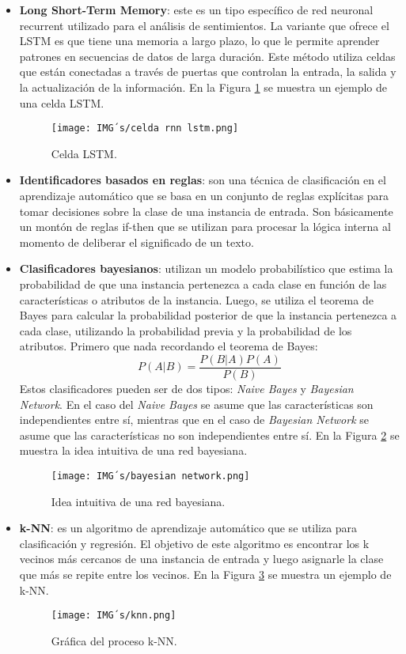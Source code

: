 \documentclass[12pt, conference]{IEEEtran}
\begin{document}
\begin{itemize}
  \item \textbf{Long Short-Term Memory}: este es un tipo específico de red neuronal recurrent utilizado para el análisis de sentimientos. La variante que ofrece el LSTM es que tiene una memoria a largo plazo, lo que le permite aprender patrones en secuencias de datos de larga duración. Este método utiliza celdas que están conectadas a través de puertas que controlan la entrada, la salida y la actualización de la información. En la Figura \ref{fig17} se muestra un ejemplo de una celda LSTM.
  \begin{figure}
    \centering
    \texttt{[image: IMG´s/celda rnn lstm.png]}
    \caption{Celda LSTM.}
    \label{fig17}
  \end{figure}

  \item \textbf{Identificadores basados en reglas}: son una técnica de clasificación en el aprendizaje automático que se basa en un conjunto de reglas explícitas para tomar decisiones sobre la clase de una instancia de entrada. Son básicamente un montón de reglas if-then que se utilizan para procesar la lógica interna al momento de deliberar el significado de un texto. 
  \item \textbf{Clasificadores bayesianos}: utilizan un modelo probabilístico que estima la probabilidad de que una instancia pertenezca a cada clase en función de las características o atributos de la instancia. Luego, se utiliza el teorema de Bayes para calcular la probabilidad posterior de que la instancia pertenezca a cada clase, utilizando la probabilidad previa y la probabilidad de los atributos. Primero que nada recordando el teorema de Bayes:
  \begin{equation}
    P(A|B) = \frac{P(B|A)P(A)}{P(B)}
  \end{equation}
  Estos clasificadores pueden ser de dos tipos: \textit{Naive Bayes} y \textit{Bayesian Network}. En el caso del \textit{Naive Bayes} se asume que las características son independientes entre sí, mientras que en el caso de \textit{Bayesian Network} se asume que las características no son independientes entre sí. En la Figura \ref{fig18} se muestra la idea intuitiva de una red bayesiana.
  \begin{figure}
    \centering
    \texttt{[image: IMG´s/bayesian network.png]}
    \caption{Idea intuitiva de una red bayesiana.}
    \label{fig18}
  \end{figure}

  \item \textbf{k-NN}: es un algoritmo de aprendizaje automático que se utiliza para clasificación y regresión. El objetivo de este algoritmo es encontrar los k vecinos más cercanos de una instancia de entrada y luego asignarle la clase que más se repite entre los vecinos. En la Figura \ref{fig19} se muestra un ejemplo de k-NN.
  \begin{figure}
    \centering
    \texttt{[image: IMG´s/knn.png]}
    \caption{Gráfica del proceso k-NN.}
    \label{fig19}
  \end{figure}
\end{itemize}
\end{document}
